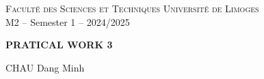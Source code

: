\documentclass[11pt,a4paper]{article}
\begin{document}
\thispagestyle{empty}

\begin{center}

  \textsc{Facult\'e des Sciences et Techniques}  \hfill \textsc{Universit\'e de Limoges} \\
  \hfill M2 -- Semester 1 -- 2024/2025 \\
  \bigskip

\end{center}

\begin{center}
  \textbf{\Large PRATICAL WORK 3} \\
  \vspace{0.5cm}

  CHAU Dang Minh
\end{center}



\printbibliography
\end{document}
